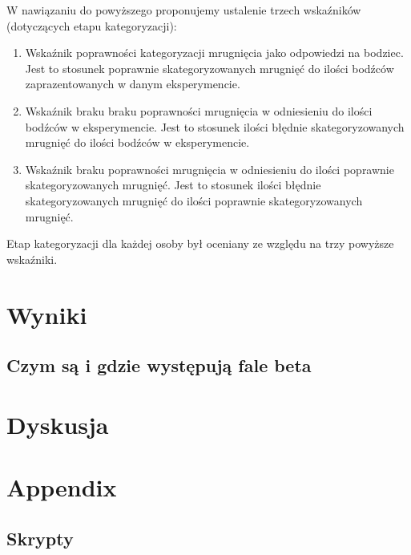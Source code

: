 \documentclass{article}
\begin{document}
    W nawiązaniu do powyższego proponujemy ustalenie trzech wskaźników (dotyczących etapu kategoryzacji):
    \begin{enumerate}
        \item Wskaźnik poprawności kategoryzacji mrugnięcia jako odpowiedzi na bodziec.
    Jest to stosunek poprawnie skategoryzowanych mrugnięć do ilości bodźców zaprazentowanych w danym eksperymencie.
        \item Wskaźnik braku braku poprawności mrugnięcia w odniesieniu do ilości bodźców w eksperymencie.
    Jest to stosunek ilości błędnie skategoryzowanych mrugnięć do ilości bodźców w eksperymencie.
    \newline
        \item Wskaźnik braku poprawności mrugnięcia w odniesieniu do ilości poprawnie skategoryzowanych mrugnięć.
    Jest to stosunek ilości błędnie skategoryzowanych mrugnięć do ilości poprawnie skategoryzowanych mrugnięć. 
    \end{enumerate}
    Etap kategoryzacji dla każdej osoby był oceniany ze względu na trzy powyższe wskaźniki.

\newpage
\section{Wyniki}

    \subsection{Czym są i gdzie występują fale beta}
    

\newpage
\section{Dyskusja}


\newpage
\section{Appendix}
    \subsection{Skrypty}
\end{document}

